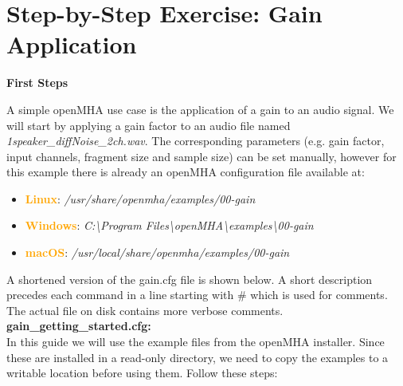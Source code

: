 \documentclass[11pt,a4paper,twoside]{article}
\newcommand{\+}{\discretionary{\mbox{\scriptsize$\hookleftarrow$}}{}{}}
\begin{document}
{{

\section{Step-by-Step Exercise: Gain Application}

\textbf{First Steps}
\label{sec:first_steps}

A simple openMHA use case is the application of a gain to an audio signal.
We will start by applying a gain factor to an audio file named {{\ttfamily \textit{1speaker\_diffNoise\_2ch.wav}}}. The corresponding parameters (e.g. gain factor, input channels, fragment size and sample size) can be set manually, however for this example there is already an openMHA configuration file available at: 
\begin{itemize}\label{list:examples-location}
\item \textcolor{orange}{\textbf{Linux}}: \textit{/usr/share/openmha/examples/00-gain} 
\item \textcolor{orange}{\textbf{Windows}}: \textit{C:\textbackslash Program Files\textbackslash openMHA\textbackslash examples\textbackslash 00-gain}
\item \textcolor{orange}{\textbf{macOS}}: \textit{/usr/local/share/openmha/examples/00-gain} 
\end{itemize}

A shortened version of the gain.cfg file is shown below.
A short description precedes each command
in a line starting with \# which is used for comments.
The actual file on disk contains more verbose comments.
\\

\textbf{gain\_getting\_started.cfg:} \\



\newpage 
In this guide we will use the example files from the openMHA installer.
Since these are installed in a read-only directory, we need to copy
the examples to a writable location before using them. 
Follow these steps:


}}
\end{document}

